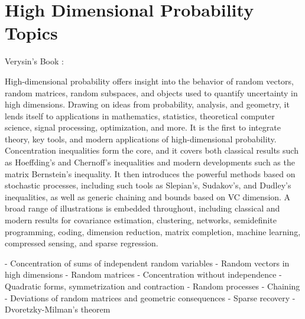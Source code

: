 \section*{High  Dimensional Probability Topics}

Verysin's Book :

High-dimensional probability offers insight into the behavior of random vectors, random matrices, random subspaces, and objects used to quantify uncertainty in high dimensions. Drawing on ideas from probability, analysis, and geometry, it lends itself to applications in mathematics, statistics, theoretical computer science, signal processing, optimization, and more. It is the first to integrate theory, key tools, and modern applications of high-dimensional probability. Concentration inequalities form the core, and it covers both classical results such as Hoeffding's and Chernoff's inequalities and modern developments such as the matrix Bernstein's inequality. It then introduces the powerful methods based on stochastic processes, including such tools as Slepian's, Sudakov's, and Dudley's inequalities, as well as generic chaining and bounds based on VC dimension. A broad range of illustrations is embedded throughout, including classical and modern results for covariance estimation, clustering, networks, semidefinite programming, coding, dimension reduction, matrix completion, machine learning, compressed sensing, and sparse regression.

- Concentration of sums of independent random variables
- Random vectors in high dimensions
- Random matrices
- Concentration without independence
- Quadratic forms, symmetrization and contraction
- Random processes
- Chaining
- Deviations of random matrices and geometric consequences
- Sparse recovery
- Dvoretzky-Milman's theorem







